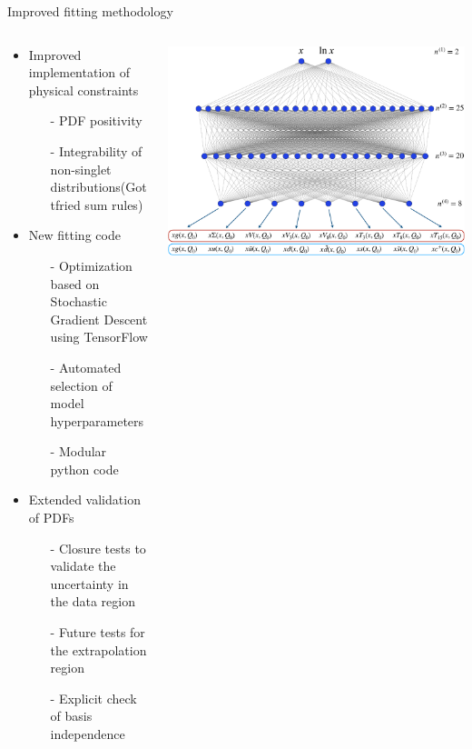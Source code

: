 \documentclass[aspectratio=169,9pt]{beamer}
\begin{document}
\begin{frame}[t]{Improved fitting methodology}
    \begin{columns}[T]
        \begin{column}{0.48\textwidth}
            \begin{itemize}
                \item Improved implementation of physical constraints
                \begin{itemize}
                    \item[-] PDF positivity
                    \item[-] Integrability of non-singlet distributions(Gottfried sum rules)
                \end{itemize}
                \item New fitting code
                \begin{itemize}
                    \item[-] Optimization based on Stochastic Gradient Descent using TensorFlow
                    \item[-] Automated selection of model hyperparameters
                    \item[-] Modular python code
                \end{itemize}
                \item Extended validation of PDFs
                \begin{itemize}
                    \item[-] Closure tests to validate the uncertainty in the data region
                    \item[-] Future tests for the extrapolation region
                    \item[-] Explicit check of basis independence
                \end{itemize}
            \end{itemize}
        \end{column}
        \begin{column}{0.48\textwidth}
            \includegraphics[width=1.0\textwidth]{NNarch}

\end{column}
\end{columns}
\end{frame}
\end{document}
